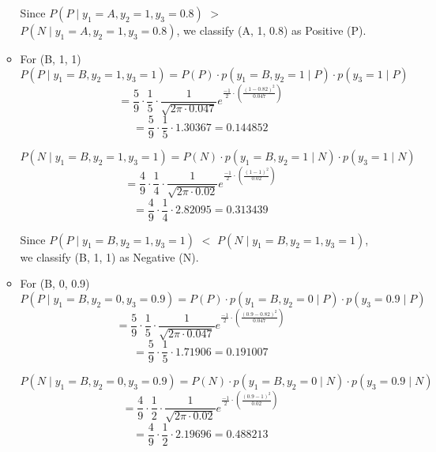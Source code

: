 \documentclass[12pt]{article}
\begin{document}
\begin{enumerate}[leftmargin=\labelsep, label=\textbf{\arabic*.)}]
\begin{itemize}
                    Since \( P(P \mid y_1 = A, y_2 = 1, y_3 = 0.8) \) \(>\) \( P(N \mid y_1 = A, y_2 = 1, y_3 = 0.8) \), we classify (A, 1, 0.8) as Positive (P).

                    \vspace{0.5em}
              \item For (B, 1, 1)
                    \[
                        P(P \mid y_1 = B, y_2 = 1, y_3 = 1) = P(P) \cdot p(y_1 = B, y_2 = 1 \mid P) \cdot p(y_3 = 1 \mid P)
                    \]
                    \[
                        = \frac{5}{9} \cdot \frac{1}{5} \cdot \frac{1}{\sqrt{2\pi \cdot 0.047}} e^{\frac{-1}{2} \cdot (\frac{(1 - 0.82)^2}{0.047})}
                    \]
                    \[
                        = \frac{5}{9} \cdot \frac{1}{5} \cdot 1.30367 = 0.144852
                    \]

                    \[
                        P(N \mid y_1 = B, y_2 = 1, y_3 = 1) = P(N) \cdot p(y_1 = B, y_2 = 1 \mid N) \cdot p(y_3 = 1 \mid N)
                    \]
                    \[
                        = \frac{4}{9} \cdot \frac{1}{4} \cdot \frac{1}{\sqrt{2\pi \cdot 0.02}} e^{\frac{-1}{2} \cdot (\frac{(1 - 1)^2}{0.02})}
                    \]
                    \[
                        = \frac{4}{9} \cdot \frac{1}{4} \cdot 2.82095 = 0.313439
                    \]

                    Since \( P(P \mid y_1 = B, y_2 = 1, y_3 = 1) \) \(<\) \( P(N \mid y_1 = B, y_2 = 1, y_3 = 1) \), we classify (B, 1, 1) as Negative (N).

                    \vspace{0.5em}
              \item For (B, 0, 0.9)
                    \[
                        P(P \mid y_1 = B, y_2 = 0, y_3 = 0.9) = P(P) \cdot p(y_1 = B, y_2 = 0 \mid P) \cdot p(y_3 = 0.9 \mid P)
                    \]
                    \[
                        = \frac{5}{9} \cdot \frac{1}{5} \cdot \frac{1}{\sqrt{2\pi \cdot 0.047}} e^{\frac{-1}{2} \cdot (\frac{(0.9 - 0.82)^2}{0.047})}
                    \]
                    \[
                        = \frac{5}{9} \cdot \frac{1}{5} \cdot 1.71906 = 0.191007
                    \]

                    \[
                        P(N \mid y_1 = B, y_2 = 0, y_3 = 0.9) = P(N) \cdot p(y_1 = B, y_2 = 0 \mid N) \cdot p(y_3 = 0.9 \mid N)
                    \]
                    \[
                        = \frac{4}{9} \cdot \frac{1}{2} \cdot \frac{1}{\sqrt{2\pi \cdot 0.02}} e^{\frac{-1}{2} \cdot (\frac{(0.9 - 1)^2}{0.02})}
                    \]
                    \[
                        = \frac{4}{9} \cdot \frac{1}{2} \cdot 2.19696 = 0.488213
                    \]


\end{itemize}
\end{enumerate}
\end{document}
